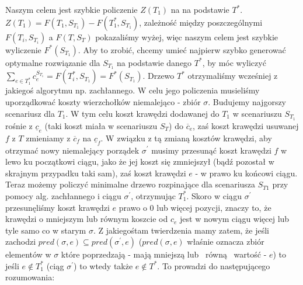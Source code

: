 Naszym celem jest szybkie policzenie $Z \left( T_{1} \right)$ na na podstawie $T^{\ast}$. $Z \left( T_{1} \right) = F \left( T_{1}, S_{T_{1}} \right) - F \left( T_{1}^{\ast}, S_{T_{1}} \right)$, zależność między poszczególnymi $F \left( T_{i}, S_{T_{i}} \right)$ a $F \left( T, S_{T} \right)$ pokazaliśmy wyżej, więc naszym celem jest szybkie wyliczenie $F^{\ast} \left( S_{T_{1}} \right)$. Aby to zrobić, chcemy umieć najpierw szybko generować optymalne rozwiązanie dla $S_{T_{1}}$ na podstawie danego $T^{\ast}$, by móc wyliczyć $\sum_{e \in T_{1}^{\ast}} c^{S_{T_{1}}}_{e} = F \left( T_{i}^{\ast}, S_{T_{1}} \right) = F^{\ast} \left( S_{T_{1}} \right)$. Drzewo $T^{\ast}$ otrzymaliśmy wcześniej z jakiegoś algorytmu np. zachłannego. W celu jego policzenia musieliśmy uporządkować koszty wierzchołków niemalejąco - zbiór $\sigma$. Budujemy najgorszy scenariusz dla $T_{1}$. W tym celu koszt krawędzi dodawanej do $T_{1}$ w scenariuszu $S_{T_{1}}$ rośnie z $\underline{c}_{e}$ (taki koszt miała w scenariuszu $S_{T}$) do $\overline{c}_{e}$, zaś koszt krawędzi usuwanej $f$ z $T$ zmieniamy z $\overline{c}_{f}$ na $\underline{c}_{f}$. W związku z tą zmianą kosztów krawędzi, aby otrzymać nowy niemalejący porządek $\sigma^{\prime}$ musimy przesunąć koszt krawędzi $f$ w lewo ku początkowi ciągu, jako że jej koszt się zmniejszył (bądź pozostał w skrajnym przypadku taki sam), zaś koszt krawędzi $e$ - w prawo ku końcowi ciągu. Teraz możemy policzyć minimalne drzewo rozpinające dla scenariusza $S_{T{1}}$ przy pomocy alg. zachłannego i ciągu $\sigma^{\prime}$, otrzymując $T_{1}^{\ast}$. Skoro w ciągu $\sigma^{\prime}$ przesunęliśmy koszt krawędzi $e$ prawo o $0$ lub więcej pozycji, znaczy to, że krawędzi o mniejszym lub równym koszcie od $c_{e}$ jest w nowym ciągu więcej lub tyle samo co w starym $\sigma$. Z jakiegośtam twierdzenia mamy zatem, że jeśli zachodzi $pred \left( \sigma, e \right) \subseteq pred \left( \sigma^{\prime}, e \right)$ ($pred \left( \sigma, e \right)$ właśnie oznacza zbiór elementów w $\sigma$ które poprzedzają - mają mniejszą lub ~równą~ wartość - $e$) to jeśli $e \notin T_{1}^{\ast}$ (ciąg $\sigma^{\prime}$) to wtedy także $e \notin T^{\ast}$. To prowadzi do następującego rozumowania:

